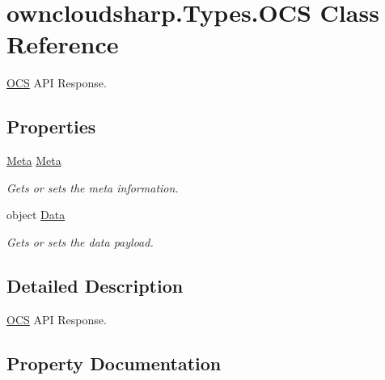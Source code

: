 \hypertarget{classowncloudsharp_1_1_types_1_1_o_c_s}{}\section{owncloudsharp.\+Types.\+O\+C\+S Class Reference}
\label{classowncloudsharp_1_1_types_1_1_o_c_s}


\hyperlink{classowncloudsharp_1_1_types_1_1_o_c_s}{O\+C\+S} A\+P\+I Response.  


\subsection*{Properties}
\begin{DoxyCompactItemize}
\item 
\hyperlink{classowncloudsharp_1_1_types_1_1_meta}{Meta} \hyperlink{classowncloudsharp_1_1_types_1_1_o_c_s_a7fed97a3502a80df264f5c38651be4c1}{Meta}
\begin{DoxyCompactList}\small\item\em Gets or sets the meta information. \end{DoxyCompactList}\item 
object \hyperlink{classowncloudsharp_1_1_types_1_1_o_c_s_ad64d4fa0e0f73ba19a0eb97b9d30f2bd}{Data}
\begin{DoxyCompactList}\small\item\em Gets or sets the data payload. \end{DoxyCompactList}\end{DoxyCompactItemize}


\subsection{Detailed Description}
\hyperlink{classowncloudsharp_1_1_types_1_1_o_c_s}{O\+C\+S} A\+P\+I Response. 



\subsection{Property Documentation}
\hypertarget{classowncloudsharp_1_1_types_1_1_o_c_s_ad64d4fa0e0f73ba19a0eb97b9d30f2bd}{}
